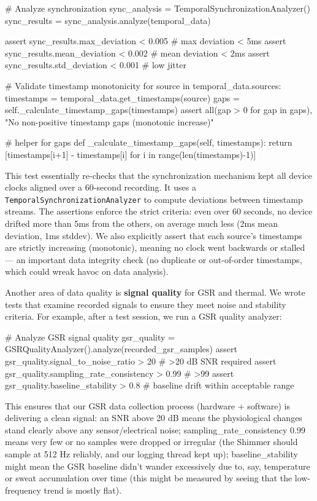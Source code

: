\documentclass[11pt,a4paper]{report}
\begin{document}
            # Analyze synchronization
            sync\_analysis = TemporalSynchronizationAnalyzer()
            sync\_results = sync\_analysis.analyze(temporal\_data)

            assert sync\_results.max\_deviation < 0.005  # max deviation < 5ms
            assert sync\_results.mean\_deviation < 0.002  # mean deviation < 2ms
            assert sync\_results.std\_deviation < 0.001  # low jitter

            # Validate timestamp monotonicity
            for source in temporal\_data.sources:
                timestamps = temporal\_data.get\_timestamps(source)
                gaps = self.\_calculate\_timestamp\_gaps(timestamps)
                assert all(gap > 0 for gap in gaps), "No non-positive timestamp gaps (monotonic increase)"

        # helper for gaps
        def \_calculate\_timestamp\_gaps(self, timestamps):
            return [timestamps[i+1] - timestamps[i] for i in range(len(timestamps)-1)]

This test essentially re-checks that the synchronization mechanism kept
all device clocks aligned over a 60-second recording. It uses a
\texttt{TemporalSynchronizationAnalyzer} to compute deviations between
timestamp streams. The assertions enforce the strict criteria: even over
60 seconds, no device drifted more than 5ms from the others, on average
much less (2ms mean deviation, 1ms stddev). We also explicitly assert
that each source's timestamps are strictly increasing (monotonic),
meaning no clock went backwards or stalled --- an important data
integrity check (no duplicate or out-of-order timestamps, which could
wreak havoc on data analysis).

Another area of data quality is \textbf{signal quality} for GSR and thermal.
We wrote tests that examine recorded signals to ensure they meet noise
and stability criteria. For example, after a test session, we run a GSR
quality analyzer:

    # Analyze GSR signal quality
    gsr\_quality = GSRQualityAnalyzer().analyze(recorded\_gsr\_samples)
    assert gsr\_quality.signal\_to\_noise\_ratio > 20  # >20 dB SNR required
    assert gsr\_quality.sampling\_rate\_consistency > 0.99  # >99%
    assert gsr\_quality.baseline\_stability > 0.8  # baseline drift within acceptable range

This ensures that our GSR data collection process (hardware + software)
is delivering a clean signal: an SNR above 20 dB means the physiological
changes stand clearly above any sensor/electrical noise;
sampling\_rate\_consistency 0.99 means very few or no samples were dropped
or irregular (the Shimmer should sample at 512 Hz reliably, and our
logging thread kept up); baseline\_stability  might mean the GSR
baseline didn't wander excessively due to, say, temperature or sweat
accumulation over time (this might be measured by seeing that the
low-frequency trend is mostly flat).
\end{document}
